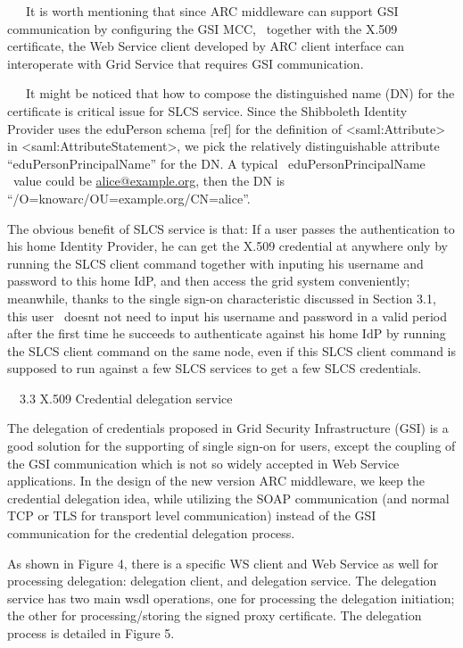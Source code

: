 \documentclass{article}
\begin{document}
\ \ \ It is worth mentioning that since ARC middleware can support GSI
communication by configuring the GSI MCC, \ together with the X.509
certificate, the Web Service client developed by ARC client interface
can interoperate with Grid Service that requires GSI communication.

\ \ \ It might be noticed that how to compose the distinguished name
(DN) for the certificate is critical issue for SLCS service. Since the
Shibboleth Identity Provider uses the eduPerson schema [ref] for the
definition of {\textless}saml:Attribute{\textgreater} in
{\textless}saml:AttributeStatement{\textgreater}, we pick the
relatively distinguishable attribute
{\textquotedblleft}eduPersonPrincipalName{\textquotedblright} for the
DN. A typical \ eduPersonPrincipalName \ value could be
\href{mailto:alice@example.org}{alice@example.org}, then the DN is
{\textquotedblleft}/O=knowarc/OU=example.org/CN=alice{\textquotedblright}.

The obvious benefit of SLCS service is that: If a user passes the
authentication to his home Identity Provider, he can get the X.509
credential at anywhere only by running the SLCS client command together
with inputing his username and password to this home IdP, and then
access the grid system conveniently; meanwhile, thanks to the single
sign-on characteristic discussed in Section 3.1, this user
\ doesn{\textquotesingle}t not need to input his username and password
in a valid period after the first time he succeeds to authenticate
against his home IdP by running the SLCS client command on the same
node, even if this SLCS client command is supposed to run against a few
SLCS services to get a few SLCS credentials.


\bigskip

\ \ 3.3 X.509 Credential delegation service

The delegation of credentials proposed in Grid Security Infrastructure
(GSI) is a good solution for the supporting of single sign-on for
users, except the coupling of the GSI communication which is not so
widely accepted in Web Service applications. In the design of the new
version ARC middleware, we keep the credential delegation idea, while
utilizing the SOAP communication (and normal TCP or TLS for transport
level communication) instead of the GSI communication for the
credential delegation process.

As shown in Figure 4, there is a specific WS client and Web Service as
well for processing delegation: delegation client, and delegation
service. The delegation service has two main wsdl operations, one for
processing the delegation initiation; the other for processing/storing
the signed proxy certificate. The delegation process is detailed in
Figure 5. 
\end{document}
